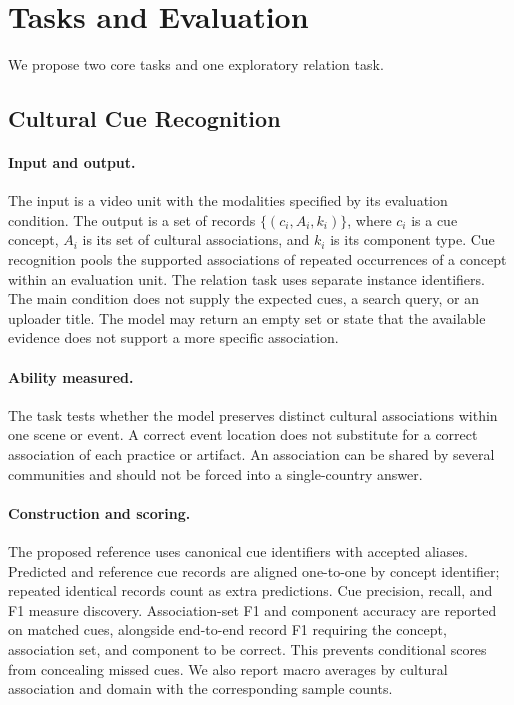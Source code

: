 \section{Tasks and Evaluation}
\label{sec:tasks}

We propose two core tasks and one exploratory relation task.

\subsection{Cultural Cue Recognition}
\label{sec:cue-task}
\paragraph{Input and output.}
The input is a video unit with the modalities specified by its evaluation condition.
The output is a set of records $\{(c_i,A_i,k_i)\}$, where $c_i$ is a cue concept, $A_i$ is its set of cultural associations, and $k_i$ is its component type.
Cue recognition pools the supported associations of repeated occurrences
of a concept within an evaluation unit. The relation task uses separate
instance identifiers.
The main condition does not supply the expected cues, a search query, or an uploader title.
The model may return an empty set or state that the available evidence does not support a more specific association.

\paragraph{Ability measured.}
The task tests whether the model preserves distinct cultural associations within one scene or event.
A correct event location does not substitute for a correct association of each practice or artifact.
An association can be shared by several communities and should not be forced into a single-country answer.

\paragraph{Construction and scoring.}
The proposed reference uses canonical cue identifiers with accepted aliases.
Predicted and reference cue records are aligned one-to-one by concept identifier; repeated identical records count as extra predictions.
Cue precision, recall, and F1 measure discovery.
Association-set F1 and component accuracy are reported on matched cues, alongside end-to-end record F1 requiring the concept, association set, and component to be correct.
This prevents conditional scores from concealing missed cues.
We also report macro averages by cultural association and domain with the corresponding sample counts.

